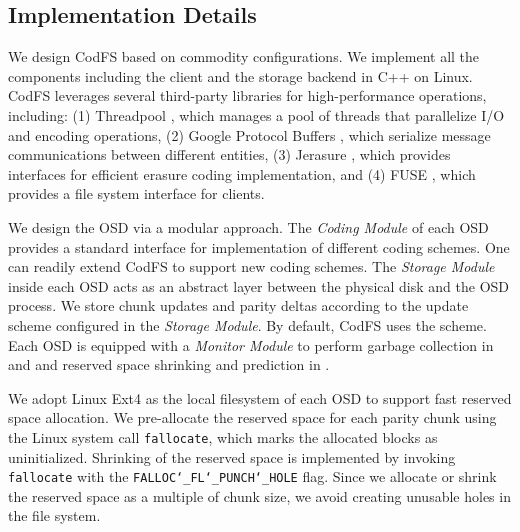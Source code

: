 \subsection{Implementation Details}
\label{sec:implementation}

We design CodFS based on commodity configurations. We implement all the
components including the client and the storage backend in C++ on Linux.
CodFS leverages several third-party libraries for high-performance operations,
including: (1) Threadpool \cite{boosttp}, which manages a pool of threads that
parallelize I/O and encoding operations, (2) Google Protocol Buffers
\cite{protobuf}, which serialize message communications between different
entities, (3) Jerasure \cite{plank09}, which provides interfaces for
efficient erasure coding implementation, and (4) FUSE \cite{fuse}, which
provides a file system interface for clients.


We design the OSD via a modular approach. The \textit{Coding Module} of 
each OSD provides a standard interface for implementation of different coding
schemes.  One can readily extend CodFS to support new coding schemes.
The \textit{Storage Module} inside each OSD acts as an abstract layer between
the physical disk and the OSD process.  We store chunk updates and parity
deltas according to the update scheme configured in the \textit{Storage
Module}.  By default, CodFS uses the \PLR scheme. Each OSD is equipped with
a \textit{Monitor Module} to perform garbage collection in \FL and \PL and
reserved space shrinking and prediction in \PLR.

We adopt Linux Ext4 as the local filesystem of each OSD to support fast
reserved space allocation.  We pre-allocate the reserved space for each parity
chunk using the Linux system call \texttt{fallocate}, which marks the
allocated blocks as uninitialized. 
Shrinking of the reserved space is implemented by invoking \texttt{fallocate}
with the \texttt{FALLOC\char`_FL\char`_PUNCH\char`_HOLE} flag. Since we
allocate or shrink the reserved space as a multiple of chunk size, we avoid
creating unusable holes in the file system.

